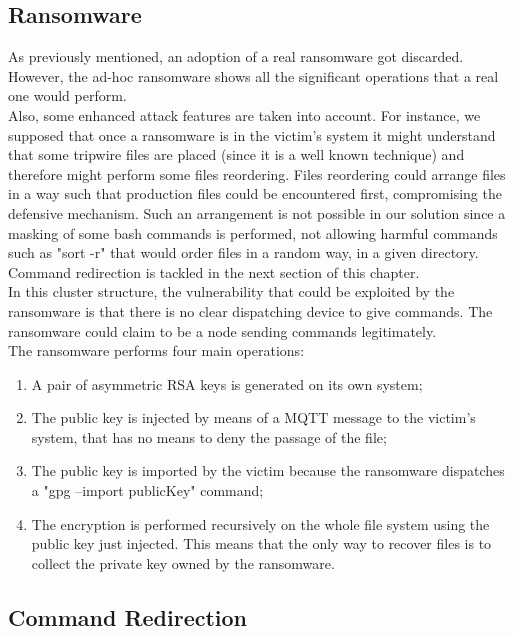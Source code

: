 \subsection{Ransomware}

As previously mentioned, an adoption of a real ransomware got discarded. However, the ad-hoc ransomware shows all the significant operations that a real one would perform.\\
Also, some enhanced attack features are taken into account. For instance, we supposed that once a ransomware is in the victim's system it might understand that some tripwire files are placed (since it is a well known technique) and therefore might perform some files reordering. Files reordering could arrange files in a way such that production files could be encountered first, compromising the defensive mechanism. Such an arrangement is not possible in our solution since a masking of some bash commands is performed, not allowing harmful commands such as "sort -r" that would order files in a random way, in a given directory. Command redirection is tackled in the next section of this chapter.\\
In this cluster structure, the vulnerability that could be exploited by the ransomware is that there is no clear dispatching device to give commands. The ransomware could claim to be a node sending commands legitimately.\\
The ransomware performs four main operations:

\begin{enumerate}
  \item A pair of asymmetric RSA keys is generated on its own system;
  \item The public key is injected by means of a MQTT message to the victim's system, that has no means to deny the passage of the file;
  \item The public key is imported by the victim because the ransomware dispatches a "gpg --import publicKey" command;
  \item The encryption is performed recursively on the whole file system using the public key just injected. This means that the only way to recover files is to collect the private key owned by the ransomware.
\end{enumerate}


\subsection{Command Redirection}
